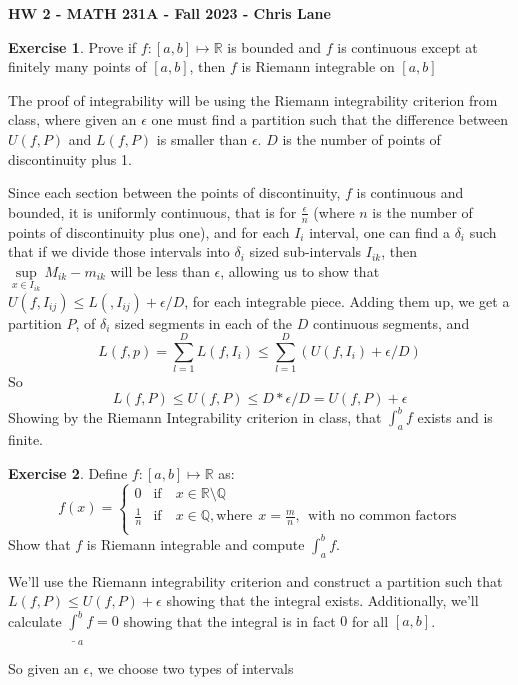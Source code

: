 \documentclass[11pt,oneside]{article}
\numberwithin{equation}{section}
\theoremstyle{definition}
\newtheorem{exercise}{Exercise}
\def\RR{\mathbb{R}}
\def\QQ{\mathbb{Q}}
\begin{document}
\textbf{HW 2 - MATH 231A - Fall 2023 - Chris Lane}
\begin{exercise}
  Prove if $f:[a, b] \mapsto \RR $ is bounded and $f$ is continuous
  except at finitely many points of $[a,b]$, then $f$ is Riemann integrable on $[a,b ]$
\end{exercise}
\begin{solution}
  The proof of integrability will be using the Riemann integrability
  criterion from class, where given an $\epsilon$ one must find a
  partition such that the difference between $U(f, P)$ and $L(f, P)$
  is smaller than $\epsilon$. $D$ is the number of points of
  discontinuity plus 1.

  Since each section between the points of discontinuity, $f$ is
  continuous and bounded, it is uniformly continuous, that is for
  $\frac{\epsilon}{n}$ (where $n$ is the number of points of
  discontinuity plus one), and for each $I_i$ interval, one can find a
  $\delta _ i$ such that if we divide those intervals into $\delta_i$
  sized sub-intervals $I_{ik}$, then $ \sup \limits_{x \in I_{ik}}
  M_{ik} - m_{ik} $ will be less than $\epsilon$, allowing us to show
  that $U(f, I_{ij}) \leq L(, I_{ij}) + \epsilon / D$, for each
  integrable piece.  Adding them up, we get a partition $P$, of
  $\delta_{i} $ sized segments in each of the $D$ continuous segments,
  and
  $$
  L(f, p) = \sum _{l=1}^D L(f, I_i) \leq \sum _{l=1}^D ( U(f, I_i) + \epsilon / D )
  $$
  So
  $$
  L(f, P) \leq U(f, P) \leq D * \epsilon / D = U(f, P) + \epsilon
  $$
  Showing by the Riemann Integrability criterion in class, that
  $\int _ a ^ b f$ exists and is finite.
  
  
\end{solution}

\begin{exercise}
  Define $f : [a,b ] \mapsto \RR $ as:
  $$
  f(x) = \begin{cases}
    0 & \text{if} \quad x \in \RR \setminus \QQ \\
    \frac{1}{n} & \text{if} \quad x \in \QQ, \text{where}\ \  x = \frac{m}{n}, \ \ 
    \text{with no common factors} \\
  \end{cases}
  $$
  Show that $f$ is Riemann integrable and compute $\int _ {a} ^ {b} f$.  
\end{exercise}
\begin{solution}
  We'll use the Riemann integrability criterion and construct a
  partition such that $L(f, P) \leq U(f, P) + \epsilon$ showing that
  the integral exists.  Additionally, we'll
  calculate $\underline \int _{a} ^ {b} f = 0$ showing
  that the integral is in fact $0$ for all $[a,b]$.

  So given an $\epsilon$, we choose two types of intervals
  
\end{solution}


\begin{comment}
\begin{exercise}
  problem
\end{exercise}
\begin{solution}
\begin{enumerate}[(a)]
\item
  first answer
\end{enumerate}
\end{solution}
\end{comment}
\end{document}
